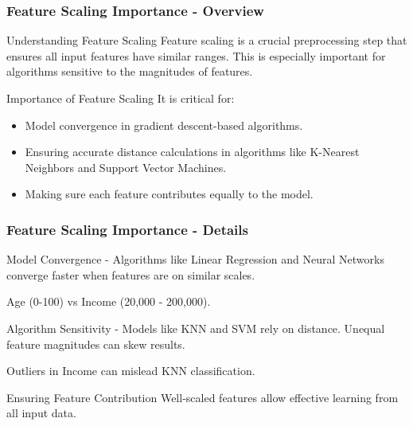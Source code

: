\documentclass[aspectratio=169]{beamer}
\begin{document}
\begin{frame}[fragile]
    \frametitle{Feature Scaling Importance - Overview}
    \begin{block}{Understanding Feature Scaling}
        Feature scaling is a crucial preprocessing step that ensures all input features have similar ranges. This is especially important for algorithms sensitive to the magnitudes of features.
    \end{block}
    
    \begin{block}{Importance of Feature Scaling}
        It is critical for:
        \begin{itemize}
            \item Model convergence in gradient descent-based algorithms.
            \item Ensuring accurate distance calculations in algorithms like K-Nearest Neighbors and Support Vector Machines.
            \item Making sure each feature contributes equally to the model.
        \end{itemize}
    \end{block}
\end{frame}

\begin{frame}[fragile]
    \frametitle{Feature Scaling Importance - Details}
    \begin{block}{Model Convergence}
        - Algorithms like Linear Regression and Neural Networks converge faster when features are on similar scales. 
        \begin{example}
            Age (0-100) vs Income (20,000 - 200,000).
        \end{example}
    \end{block}
    
    \begin{block}{Algorithm Sensitivity}
        - Models like KNN and SVM rely on distance. Unequal feature magnitudes can skew results.
        \begin{example}
            Outliers in Income can mislead KNN classification.
        \end{example}
    \end{block}
    
    \begin{block}{Ensuring Feature Contribution}
        Well-scaled features allow effective learning from all input data.
    \end{block}
\end{frame}
\end{document}
